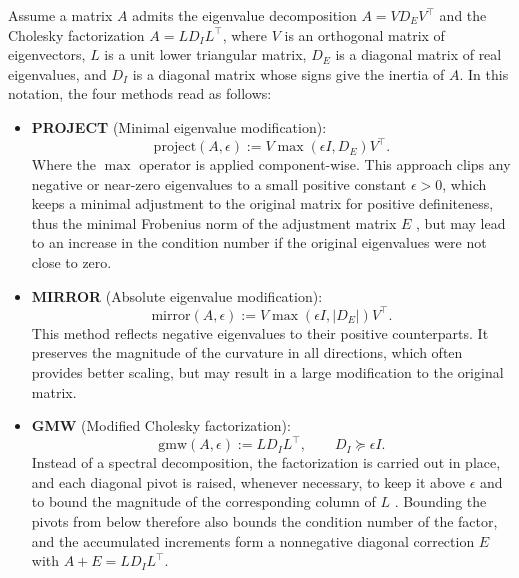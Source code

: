 \documentclass[class=scrbook, crop=false]{standalone}
\begin{document}
Assume a matrix $A$ admits the eigenvalue decomposition $A = V D_E V^\top$
and the Cholesky factorization $A = L D_I L^\top$,
where $V$ is an orthogonal matrix of eigenvectors, $L$ is a unit lower triangular matrix,
$D_E$ is a diagonal matrix of real eigenvalues, and $D_I$ is a diagonal matrix whose signs give the inertia of $A$.
In this notation, the four methods read as follows:
\begin{itemize}
    \item \textbf{PROJECT} (Minimal eigenvalue modification):
    \begin{equation*}
        \mathrm{project}(A, \epsilon) := V \max(\epsilon I, D_E) V^\top.
    \end{equation*}
    Where the $\max$ operator is applied component-wise. 
    This approach clips any negative or near-zero eigenvalues to a small positive constant $\epsilon > 0$,
    which keeps a minimal adjustment to the original matrix for positive definiteness, 
    thus the minimal Frobenius norm of the adjustment matrix $E$ \cite{nocedal2006numerical},
    but may lead to an increase in the condition number if the original eigenvalues were not close to zero.

    \item \textbf{MIRROR} (Absolute eigenvalue modification):
    \begin{equation*}
        \mathrm{mirror}(A, \epsilon) := V \max(\epsilon I, |D_E|) V^\top.
    \end{equation*}
    This method reflects negative eigenvalues to their positive counterparts. 
    It preserves the magnitude of the curvature in all directions, 
    which often provides better scaling,
    but may result in a large modification to the original matrix.

    \item \textbf{GMW} (Modified Cholesky factorization):
    \begin{equation*}
        \mathrm{gmw}(A, \epsilon) := L D_I L^\top, \qquad D_I \succeq \epsilon I.
    \end{equation*}
    Instead of a spectral decomposition, the factorization is carried out in place, and each diagonal pivot is raised,
    whenever necessary, to keep it above $\epsilon$ and to bound the magnitude of the corresponding column of $L$ \cite{gill1981practical}.
    Bounding the pivots from below therefore also bounds the condition number of the factor,
    and the accumulated increments form a nonnegative diagonal correction $E$ with $A + E = L D_I L^\top$.


\end{itemize}
\end{document}
